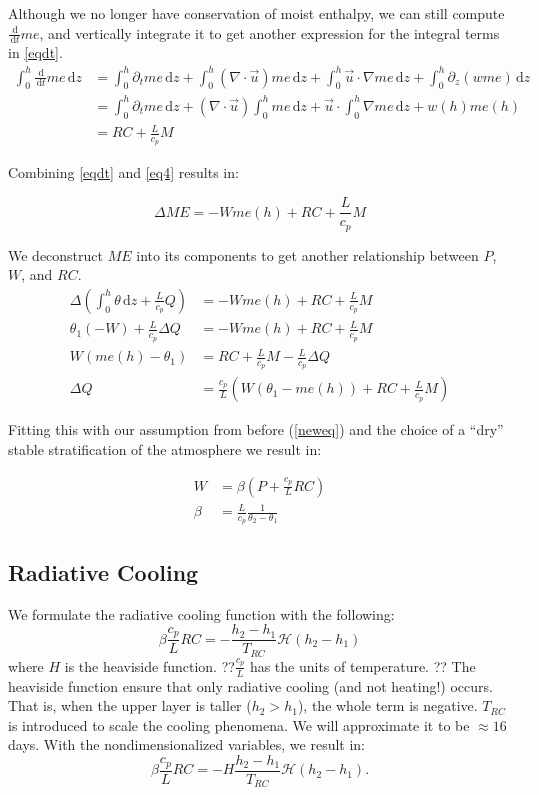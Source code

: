 \documentclass[10pt]{article}
\newcommand{\rmd}{\,\mathrm{d}}
\newcommand{\HH}{\mathcal{H}}
\begin{document}
Although we no longer have conservation of moist enthalpy, we can still compute $\frac{\rmd}{\rmd t} me$, and vertically integrate it to get another expression for the integral terms in \ref{eqdt}.  
\begin{align}
\int_{0}^{h} \frac{\rmd}{\rmd t} me \rmd z &= \int_{0}^{h} \partial_t me \rmd z + \int_{0}^{h} (\nabla \cdot \vec{u}) me \rmd z + \int_{0}^{h} \vec{u} \cdot \nabla me \rmd z + \int_{0}^{h} \partial_z (w me) \rmd z \\
&= \int_{0}^{h} \partial_t me \rmd z + (\nabla \cdot \vec{u})\int_{0}^{h}  me \rmd z + \vec{u} \cdot \int_{0}^{h} \nabla me \rmd z + w(h)me(h) \\
&= RC + \frac{L}{c_p} M \label{eq4}
\end{align}

Combining \ref{eqdt} and \ref{eq4} results in:

\begin{equation}
 \Delta ME = -W me(h) + RC + \frac{L}{c_p} M
\end{equation}

We deconstruct $ME$ into its components to get another relationship between $P$, $W$, and $RC$. 
\begin{align*}
\Delta \left(\int_{0}^{h}\theta \rmd z + \frac{L}{c_p}Q \right) &= -W me(h) + RC + \frac{L}{c_p} M \\
\theta_1(-W) + \frac{L}{c_p}\Delta Q &=  -W me(h) + RC + \frac{L}{c_p} M \\
W \left(me(h) - \theta_1 \right) &= RC + \frac{L}{c_p} M  - \frac{L}{c_p}\Delta Q\\
\Delta Q &=\frac{c_p}{L} \left(W \left(\theta_1 - me(h) \right) + RC + \frac{L}{c_p} M  \right)
\end{align*}

Fitting this with our assumption from before (\ref{neweq}) and the choice of a ``dry'' stable stratification of the atmosphere we result in:

\begin{align}
W &= \beta\left(P+\frac{c_p}{L} RC\right)\\
\beta &= \frac{L}{c_p}\frac{1}{\theta_2-\theta_1}
\end{align}

\subsection{Radiative Cooling}

We formulate the radiative cooling function with the following:
\begin{equation}
\beta \frac{c_p}{L} RC = -\frac{h_2-h_1}{T_{RC}}\HH(h_2-h_1)
\end{equation}
where $H$ is the heaviside function. ??$\frac{c_p}{L}$ has the units of temperature. ?? The heaviside function ensure that only radiative cooling (and not heating!) occurs. That is, when the upper layer  is taller ($h_2 > h_1$), the whole term is negative. $T_{RC}$ is introduced to scale the cooling phenomena. We will approximate it to be $\approx 16$ days. With the nondimensionalized variables, we result in:
\begin{equation}
\beta \frac{c_p}{L} RC = -H\frac{h_2-h_1}{T_{RC}}\HH(h_2-h_1).
\end{equation}
\end{document}
